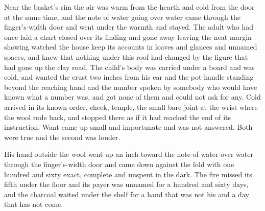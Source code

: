 Near the basket's rim the air was warm from the hearth and cold from the door at the same time, and the note of water going over water came through the finger's-width door and went under the warmth and stayed. The adult who had once laid a chart closed over its finding and gone away leaving the neat margin showing watched the house keep its accounts in loaves and glances and unnamed spaces, and knew that nothing under this roof had changed by the figure that had gone up the clay road. The child's body was carried under a board and was cold, and wanted the crust two inches from his ear and the pot handle standing beyond the reaching hand and the number spoken by somebody who would have known what a number was, and got none of them and could not ask for any. Cold arrived in its known order, cheek, temple, the small bare joint at the wrist where the wool rode back, and stopped there as if it had reached the end of its instruction. Want came up small and importunate and was not answered. Both were true and the second was louder.

His hand outside the wool went up an inch toward the note of water over water through the finger's-width door and came down against the fold with one hundred and sixty exact, complete and unspent in the dark. The fire missed its fifth under the floor and its payer was unnamed for a hundred and sixty days, and the charcoal waited under the shelf for a hand that was not his and a day that has not come.
